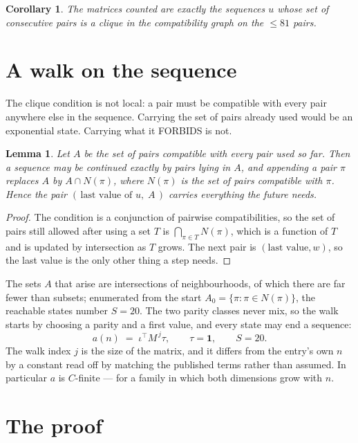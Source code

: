 \documentclass[11pt,a4paper]{article}
\theoremstyle{plain}
\newtheorem{lemma}[theorem]{Lemma}
\newtheorem{corollary}[theorem]{Corollary}
\theoremstyle{definition}
\begin{document}
\begin{corollary}
The matrices counted are exactly the sequences $u$ whose set of consecutive pairs is a clique in
the compatibility graph on the $\le 81$ pairs.
\end{corollary}

\section{A walk on the sequence}

The clique condition is not local: a pair must be compatible with every pair anywhere else in
the sequence. Carrying the set of pairs already used would be an exponential state. Carrying
what it FORBIDS is not.

\begin{lemma}\label{lem:lump}
Let $A$ be the set of pairs compatible with every pair used so far. Then a sequence may be
continued exactly by pairs lying in $A$, and appending a pair $\pi$ replaces $A$ by
$A\cap N(\pi)$, where $N(\pi)$ is the set of pairs compatible with $\pi$. Hence the pair
$(\,\text{last value of }u,\;A\,)$ carries everything the future needs.
\end{lemma}

\begin{proof}
The condition is a conjunction of pairwise compatibilities, so the set of pairs still allowed
after using a set $T$ is $\bigcap_{\pi\in T}N(\pi)$, which is a function of $T$ and is updated
by intersection as $T$ grows. The next pair is $(\text{last value},w)$, so the last value is
the only other thing a step needs.
\end{proof}

The sets $A$ that arise are intersections of neighbourhoods, of which there are far fewer than
subsets; enumerated from the start $A_0=\{\pi:\pi\in N(\pi)\}$, the reachable states number
$S=20$. The two parity classes never mix, so the walk starts by choosing a parity and a first
value, and every state may end a sequence:
\[
a(n)\;=\;\iota^{\!\top}M^{\,j}\tau ,\qquad \tau=\mathbf{1},\qquad S=20.
\]
The walk index $j$ is the size of the matrix, and it differs from the entry's own $n$ by a
constant read off by matching the published terms rather than assumed. In particular $a$ is
$C$-finite --- for a family in which both dimensions grow with $n$.

\section{The proof}
\end{document}
